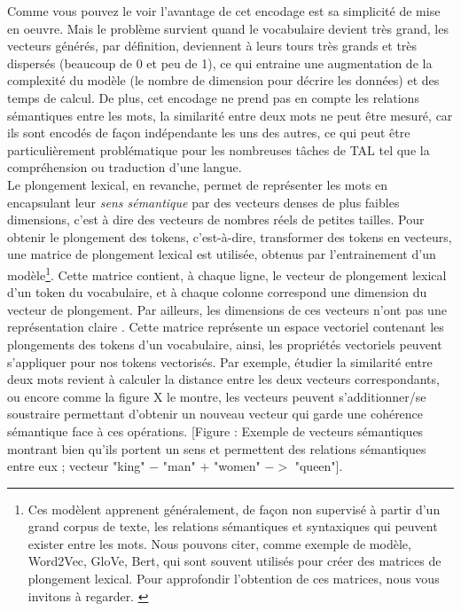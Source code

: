 \documentclass[12pt, french, twoside]{report}
\begin{document}
Comme vous pouvez le voir l'avantage de cet encodage est sa simplicité de mise en oeuvre. Mais le problème survient quand le vocabulaire devient très grand, les vecteurs générés, par définition, deviennent à leurs tours très grands et très dispersés (beaucoup de 0 et peu de 1), ce qui entraine une augmentation de la complexité du modèle (le nombre de dimension pour décrire les données) et des temps de calcul. De plus, cet encodage ne prend pas en compte les relations sémantiques entre les mots, la similarité entre deux mots ne peut être mesuré,  car ils sont encodés de façon indépendante les uns des autres, ce qui peut être particulièrement problématique pour les nombreuses tâches de TAL tel que la compréhension ou traduction d'une langue.\\

Le plongement lexical, en revanche, permet de représenter les mots en encapsulant leur \textit{sens sémantique} par des vecteurs denses de plus faibles dimensions, c'est à dire des vecteurs de nombres réels de petites tailles. Pour obtenir le plongement des tokens, c'est-à-dire, transformer des tokens en vecteurs, une matrice de plongement lexical est utilisée, obtenus par l'entrainement d'un modèle\footnote{Ces modèlent apprenent généralement, de façon non supervisé à partir d'un grand corpus de texte, les relations sémantiques et syntaxiques qui peuvent exister entre les mots. Nous pouvons citer, comme exemple de modèle, Word2Vec, GloVe, Bert, qui sont souvent utilisés pour créer des matrices de plongement lexical. Pour approfondir l'obtention de ces matrices, nous vous invitons à regarder. \citep[chap.~6, 7, 11]{jurafsky}}. Cette matrice contient, à chaque ligne, le vecteur de plongement lexical d'un token du vocabulaire, et à chaque colonne correspond une dimension du vecteur de plongement. Par ailleurs, les dimensions de ces vecteurs n'ont pas une représentation claire \citep[chap.~6]{jurafsky}. Cette matrice représente un espace vectoriel contenant les plongements des tokens d'un vocabulaire, ainsi, les propriétés vectoriels peuvent s'appliquer pour nos tokens vectorisés. Par exemple, étudier la similarité entre deux mots revient à calculer la distance entre les deux vecteurs correspondants, ou encore comme la figure X le montre, les vecteurs peuvent s'additionner/se soustraire permettant d'obtenir un nouveau vecteur qui garde une cohérence sémantique face à ces opérations. [Figure : Exemple de vecteurs sémantiques montrant bien qu'ils portent un sens et permettent des relations sémantiques entre eux ; vecteur "king" $-$ "man" $+$ "women" $->$ "queen"].
\end{document}
